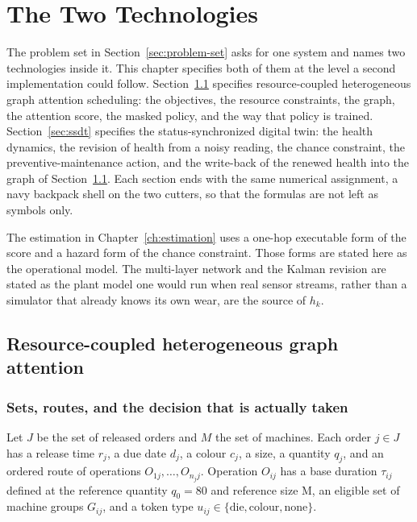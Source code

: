 \chapter{The Two Technologies}
\label{ch:methods}

The problem set in Section~\ref{sec:problem-set} asks for one system and names two technologies inside it. This chapter specifies both of them at the level a second implementation could follow. Section~\ref{sec:rch} specifies resource-coupled heterogeneous graph attention scheduling: the objectives, the resource constraints, the graph, the attention score, the masked policy, and the way that policy is trained. Section~\ref{sec:ssdt} specifies the status-synchronized digital twin: the health dynamics, the revision of health from a noisy reading, the chance constraint, the preventive-maintenance action, and the write-back of the renewed health into the graph of Section~\ref{sec:rch}. Each section ends with the same numerical assignment, a navy backpack shell on the two cutters, so that the formulas are not left as symbols only.

The estimation in Chapter~\ref{ch:estimation} uses a one-hop executable form of the score and a hazard form of the chance constraint. Those forms are stated here as the operational model. The multi-layer network and the Kalman revision are stated as the plant model one would run when real sensor streams, rather than a simulator that already knows its own wear, are the source of \(h_k\).

\section{Resource-coupled heterogeneous graph attention}
\label{sec:rch}

\subsection{Sets, routes, and the decision that is actually taken}

Let \(J\) be the set of released orders and \(M\) the set of machines. Each order \(j \in J\) has a release time \(r_j\), a due date \(d_j\), a colour \(c_j\), a size, a quantity \(q_j\), and an ordered route of operations \(O_{1j},\ldots,O_{n_j j}\). Operation \(O_{ij}\) has a base duration \(\tau_{ij}\) defined at the reference quantity \(q_0 = 80\) and reference size M, an eligible set of machine groups \(G_{ij}\), and a token type \(u_{ij} \in \{\mathrm{die},\mathrm{colour},\mathrm{none}\}\).

